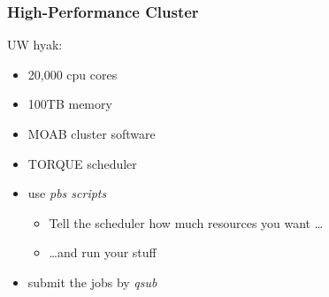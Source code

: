 \documentclass[pdftex]{beamer}
\begin{document}
\begin{frame}
  \frametitle{High-Performance Cluster}
  UW hyak:
  \begin{itemize}
  \item 20,000 cpu cores
  \item 100TB memory
  \item MOAB cluster software
  \item TORQUE scheduler
  \item use \emph{pbs scripts}
    \begin{itemize}
    \item Tell the scheduler how much resources you want \dots
    \item \dots and run your stuff \smiley
    \end{itemize}
  \item submit the jobs by \emph{qsub}
  \end{itemize}
\end{frame}
\end{document}
